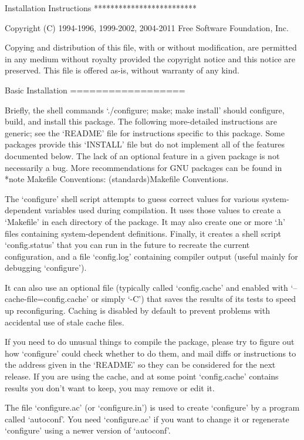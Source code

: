
\begin{DoxyVerbInclude}
Installation Instructions
*************************

Copyright (C) 1994-1996, 1999-2002, 2004-2011 Free Software Foundation,
Inc.

   Copying and distribution of this file, with or without modification,
are permitted in any medium without royalty provided the copyright
notice and this notice are preserved.  This file is offered as-is,
without warranty of any kind.

Basic Installation
==================

   Briefly, the shell commands `./configure; make; make install' should
configure, build, and install this package.  The following
more-detailed instructions are generic; see the `README' file for
instructions specific to this package.  Some packages provide this
`INSTALL' file but do not implement all of the features documented
below.  The lack of an optional feature in a given package is not
necessarily a bug.  More recommendations for GNU packages can be found
in *note Makefile Conventions: (standards)Makefile Conventions.

   The `configure' shell script attempts to guess correct values for
various system-dependent variables used during compilation.  It uses
those values to create a `Makefile' in each directory of the package.
It may also create one or more `.h' files containing system-dependent
definitions.  Finally, it creates a shell script `config.status' that
you can run in the future to recreate the current configuration, and a
file `config.log' containing compiler output (useful mainly for
debugging `configure').

   It can also use an optional file (typically called `config.cache'
and enabled with `--cache-file=config.cache' or simply `-C') that saves
the results of its tests to speed up reconfiguring.  Caching is
disabled by default to prevent problems with accidental use of stale
cache files.

   If you need to do unusual things to compile the package, please try
to figure out how `configure' could check whether to do them, and mail
diffs or instructions to the address given in the `README' so they can
be considered for the next release.  If you are using the cache, and at
some point `config.cache' contains results you don't want to keep, you
may remove or edit it.

   The file `configure.ac' (or `configure.in') is used to create
`configure' by a program called `autoconf'.  You need `configure.ac' if
you want to change it or regenerate `configure' using a newer version
of `autoconf'.


\end{DoxyVerbInclude}
